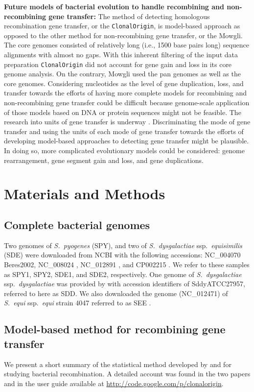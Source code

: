\documentclass[english]{article}
\begin{document}
\textbf{Future models of bacterial evolution to handle recombining and
non-recombining gene transfer:}
The method of detecting homologous recombination gene transfer, or
the \texttt{ClonalOrigin}, is model-based approach as opposed to the other
method for non-recombining gene transfer, or the Mowgli.
The core genomes consisted of relatively long (i.e., 1500 base pairs
long) sequence alignments with almost no gaps. With this inherent
filtering of the input data preparation \texttt{ClonalOrigin} did not account
for gene gain and loss in its core genome analysis. On the contrary,
Mowgli used the pan genomes as well as the core genomes.  Considering
nucleotides as the level of gene duplication, loss, and transfer towards
the efforts of having more complete models for recombining and non-recombining
gene transfer
could be difficult because genome-scale application of those models
based on DNA or protein sequences might not be feasible.
The research into units
of gene transfer is underway \citep[e.g.,][]{Chan2009a}. Discriminating
the mode of gene transfer and using the units of each mode of gene
transfer towards the efforts of developing model-based approaches
to detecting gene transfer might be plausible. In doing so, more complicated
evolutionary models could be considered: genome rearrangement,
gene segment gain and loss, and gene duplications. 


\section{Materials and Methods}

\subsection{Complete bacterial genomes}
Two genomes of \textit{S.\ pyogenes} (SPY), and two of \textit{S.\ dysgalactiae}
ssp.\textit{\ equisimilis} (SDE) were downloaded from NCBI with the following
accessions: NC\_004070 {Beres2002}, NC\_008024 \citep{Beres2006}, NC\_012891
\citep{Shimomura2011}, and CP002215 \citep{Suzuki2011}. We refer to these
samples as SPY1, SPY2, SDE1, and SDE2, respectively. One genome of 
\textit{S.\ dysgalactiae} ssp.\textit{\ dysgalactiae} was provided by 
\citet{Suzuki2011}
with accession identifiers of SddyATCC27957, referred to here as SDD. We also
downloaded the genome (NC\_012471) of \textit{S.\ equi} ssp.\textit{\ equi}
strain 4047 referred to as SEE \citep{Holden2009}.

\subsection{Model-based method for recombining gene transfer}
We present a short summary of the statistical method developed by
\citet{Didelot2007} and \citet{Didelot2010} for studying bacterial
recombination. A detailed account was found in the two papers and in the user
guide available at \url{http://code.google.com/p/clonalorigin}.  
\end{document}
